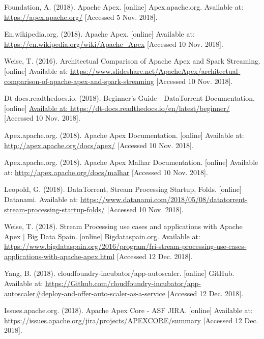 \documentclass[final]{IEEEtran}
\begin{document}
\begin{thebibliography}{99}
  Foundation, A. (2018). Apache Apex. [online] Apex.apache.org. Available at: \url{https://apex.apache.org/} [Accessed 5 Nov. 2018].
  
  En.wikipedia.org. (2018). Apache Apex. [online] Available at: \url{https://en.wikipedia.org/wiki/Apache_Apex} [Accessed 10 Nov. 2018].
  
  Weise, T. (2016). Architectual Comparison of Apache Apex and Spark Streaming. [online] Available at: \url{https://www.slideshare.net/ApacheApex/architectual-comparison-of-apache-apex-and-spark-streaming} [Accessed 10 Nov. 2018].

  Dt-docs.readthedocs.io. (2018). Beginner's Guide - DataTorrent Documentation. [online] \url{Available at: https://dt-docs.readthedocs.io/en/latest/beginner/} [Accessed 10 Nov. 2018].

  Apex.apache.org. (2018). Apache Apex Documentation. [online] Available at: \url{http://apex.apache.org/docs/apex/} [Accessed 10 Nov. 2018].

  Apex.apache.org. (2018). Apache Apex Malhar Documentation. [online] Available at: \url{http://apex.apache.org/docs/malhar} [Accessed 10 Nov. 2018].

  Leopold, G. (2018). DataTorrent, Stream Processing Startup, Folds. [online] Datanami. Available at: \url{https://www.datanami.com/2018/05/08/datatorrent-stream-processing-startup-folds/} [Accessed 10 Nov. 2018].

  Weise, T. (2018). Stream Processing use cases and applications with Apache Apex | Big Data Spain. [online] Bigdataspain.org. Available at: \url{https://www.bigdataspain.org/2016/program/fri-stream-processing-use-cases-applications-with-apache-apex.html} [Accessed 12 Dec. 2018].

  Yang, B. (2018). cloudfoundry-incubator/app-autoscaler. [online] GitHub. Available at: \url{https://Github.com/cloudfoundry-incubator/app-autoscaler\#deploy-and-offer-auto-scaler-as-a-service} [Accessed 12 Dec. 2018].

  Issues.apache.org. (2018). Apache Apex Core - ASF JIRA. [online] Available at: \url{https://issues.apache.org/jira/projects/APEXCORE/summary} [Accessed 12 Dec. 2018].
\end{thebibliography}
\end{document}
